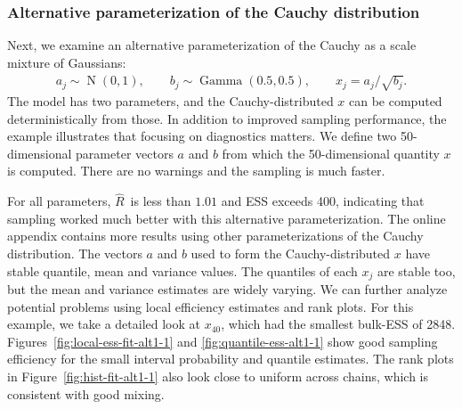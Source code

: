 \documentclass[american,]{article}
\DeclareMathOperator{\N}{N}
\DeclareMathOperator{\Gam}{Gamma}
\newcommand{\Rhat}{$\widehat{R}$}
\theoremstyle{definition}
\begin{document}
\hypertarget{alternative-parameterization-of-the-cauchy-distribution}{%
\subsubsection*{Alternative parameterization of the
Cauchy distribution}\label{alternative-parameterization-of-the-cauchy-distribution}}

Next, we examine an alternative parameterization  of the
Cauchy as a scale mixture of Gaussians:
\begin{align}
  a_j \sim  \N(0,1), \qquad
  b_j \sim  \Gam (0.5, 0.5), \qquad
  x_j =  a_j/\sqrt{b_j}.
\end{align}
The model has two parameters, and the Cauchy-distributed \(x\) can be
computed deterministically from those. In addition to improved sampling 
performance, the example illustrates that focusing on diagnostics matters.
We define two 50-dimensional parameter vectors $a$ and $b$ from which
the 50-dimensional quantity $x$ is computed. There are no warnings and
the sampling is much faster.


For all parameters, \Rhat\ is less than \(1.01\) and 
ESS exceeds 400, indicating that
sampling worked much better with this alternative parameterization.
The online appendix contains more results using other parameterizations 
of the Cauchy distribution. The vectors \(a\) and \(b\) used
to form the Cauchy-distributed \(x\) have stable quantile, mean and
variance values. The quantiles of each \(x_j\) are stable too, but the mean and variance estimates are widely varying.
%
We can further analyze potential problems using local efficiency
estimates and rank plots. For this example, we take a detailed look at 
\(x_{40}\), which had the smallest bulk-ESS of 2848.
%
Figures~\ref{fig:local-ess-fit-alt1-1} and
\ref{fig:quantile-ess-alt1-1} show good sampling efficiency for the
small interval probability and quantile estimates.
%
The rank plots in Figure~\ref{fig:hist-fit-alt1-1} also look close to
uniform across chains, which is consistent with good mixing.
\end{document}
